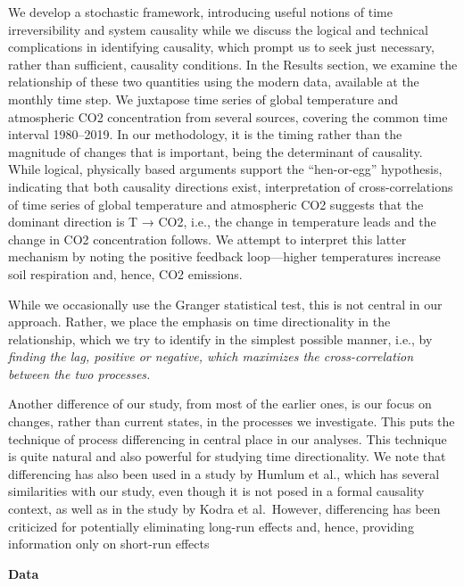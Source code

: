 \documentclass[
]{book}
\begin{document}
We develop a stochastic framework, introducing useful notions of time irreversibility and system causality while we discuss the logical and technical complications in identifying causality, which prompt us to seek just necessary, rather than sufficient, causality conditions. In the Results section, we examine the relationship of these two quantities using the modern data, available at the monthly time step. We juxtapose time series of global temperature and atmospheric CO2 concentration from several sources, covering the common time interval 1980--2019. In our methodology, it is the timing rather than the magnitude of changes that is important, being the determinant of causality. While logical, physically based arguments support the ``hen-or-egg'' hypothesis, indicating that both causality directions exist, interpretation of cross-correlations of time series of global temperature and atmospheric CO2 suggests that the dominant direction is T → CO2, i.e., the change in temperature leads and the change in CO2 concentration follows. We attempt to interpret this latter mechanism by noting the positive feedback loop---higher temperatures increase soil respiration and, hence, CO2 emissions.

While we occasionally use the Granger statistical test, this is not central
in our approach.
Rather, we place the emphasis on time directionality in the relationship,
which we try to identify in the simplest possible manner, i.e.,
by \emph{finding the lag, positive or negative, which
maximizes the cross-correlation between the two processes.}

Another difference of our study, from most of the earlier ones, is our focus on changes, rather than
current states, in the processes we investigate. This puts the technique of process differencing in
central place in our analyses. This technique is quite natural and also powerful for studying time
directionality. We note that differencing has also been used in a study by Humlum et al.,
which has several similarities with our study, even though it is not posed in a formal causality context,
as well as in the study by Kodra et al.~However, differencing has been criticized for potentially
eliminating long-run effects and, hence, providing information only on short-run effects

\textbf{Data}
\end{document}
